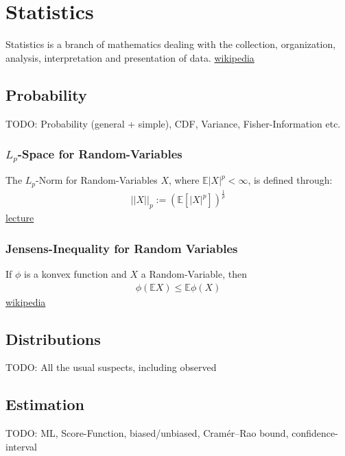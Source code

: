\chapter{Statistics}
Statistics is a branch of mathematics dealing with the collection, organization, analysis, interpretation and presentation of data.
\href{https://en.wikipedia.org/wiki/Statistics}{wikipedia}

\section{Probability}
TODO: Probability (general + simple), CDF, Variance, Fisher-Information etc.
\subsection{$L_p$-Space for Random-Variables}
The $L_p$-Norm for Random-Variables $X$, where $\mathbb{E}|X|^p < \infty$, is defined through:
\begin{align*}
	||X||_p:=(\mathbb{E}[|X|^p])^{\frac{1}{p}}
\end{align*}
\href{http://www2.stat.duke.edu/courses/Fall18/sta711/lec/wk-05.pdf}{lecture}

\subsection{Jensens-Inequality for Random Variables}
If $\phi$ is a konvex function and $X$ a Random-Variable, then
\begin{align*}
	\phi(\mathbb{E}X) \leq \mathbb{E}\phi(X)
\end{align*}
\href{https://en.wikipedia.org/wiki/Jensen%27s_inequality}{wikipedia}

\section{Distributions}
TODO: All the usual suspects, including observed

\section{Estimation}
TODO: ML, Score-Function, biased/unbiased, Cramér–Rao bound, confidence-interval

